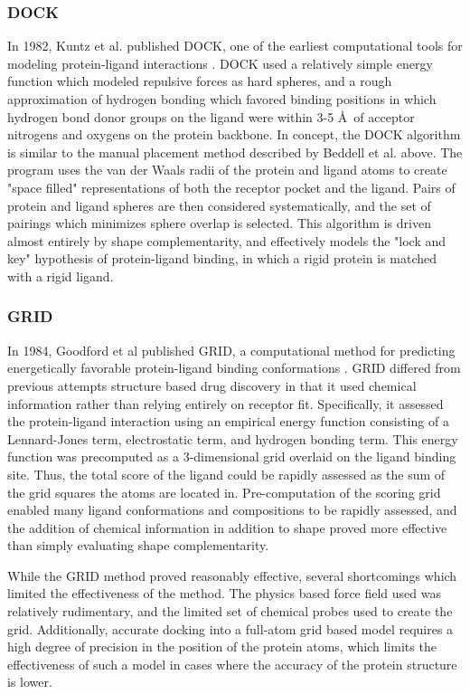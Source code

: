 \subsubsection{DOCK}
In 1982, Kuntz et al. published DOCK, one of the earliest computational tools for modeling protein-ligand interactions \citep{Kuntz:1982wx}.  DOCK used a relatively simple energy function which modeled repulsive forces as hard spheres, and a rough approximation of hydrogen bonding which favored binding positions in which hydrogen bond donor groups on the ligand were within 3-5 \AA\ of acceptor nitrogens and oxygens on the protein backbone.
In concept, the DOCK algorithm is similar to the manual placement method described by Beddell et al. above.
The program uses the van der Waals radii of the protein and ligand atoms to create "space filled" representations of both the receptor pocket and the ligand.
Pairs of protein and ligand spheres are then considered systematically, and the set of pairings which minimizes sphere overlap is selected.
This algorithm is driven almost entirely by shape complementarity, and effectively models the "lock and key" hypothesis of protein-ligand binding, in which a rigid protein is matched with a rigid ligand.

\subsubsection{GRID}
In 1984, Goodford et al published GRID, a computational method for predicting energetically favorable protein-ligand binding conformations \citep{Goodford:1985bf}.
GRID differed from previous attempts structure based drug discovery in that it used chemical information rather than relying entirely on receptor fit.
Specifically, it assessed the protein-ligand interaction using an empirical energy function consisting of a Lennard-Jones term, electrostatic term, and hydrogen bonding term.
This energy function was precomputed as a 3-dimensional grid overlaid on the ligand binding site.
Thus, the total score of the ligand could be rapidly assessed as the sum of the grid squares the atoms are located in.
Pre-computation of the scoring grid enabled many ligand conformations and compositions to be rapidly assessed, and the addition of chemical information in addition to shape proved more effective than simply evaluating shape complementarity.

While the GRID method proved reasonably effective, several shortcomings which limited the effectiveness of the method.
The physics based force field used was relatively rudimentary, and the limited set of chemical probes used to create the grid.
Additionally, accurate docking into a full-atom grid based model requires a high degree of precision in the position of the protein atoms, which limits the effectiveness of such a model in cases where the accuracy of the protein structure is lower.

